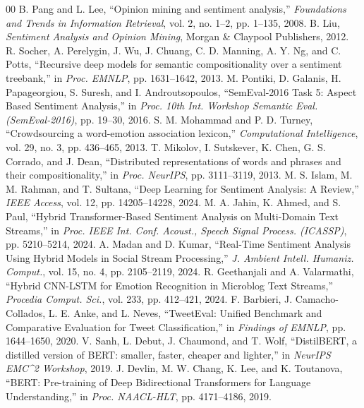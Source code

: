 \documentclass[conference]{IEEEtran}
\begin{document}

\begin{thebibliography}{00}
 B. Pang and L. Lee, ``Opinion mining and sentiment analysis,'' \textit{Foundations and Trends in Information Retrieval}, vol. 2, no. 1--2, pp. 1--135, 2008.
 B. Liu, \textit{Sentiment Analysis and Opinion Mining}, Morgan \& Claypool Publishers, 2012.
 R. Socher, A. Perelygin, J. Wu, J. Chuang, C. D. Manning, A. Y. Ng, and C. Potts, ``Recursive deep models for semantic compositionality over a sentiment treebank,'' in \textit{Proc. EMNLP}, pp. 1631--1642, 2013.
 M. Pontiki, D. Galanis, H. Papageorgiou, S. Suresh, and I. Androutsopoulos, ``SemEval-2016 Task 5: Aspect Based Sentiment Analysis,'' in \textit{Proc. 10th Int. Workshop Semantic Eval. (SemEval-2016)}, pp. 19--30, 2016.
 S. M. Mohammad and P. D. Turney, ``Crowdsourcing a word-emotion association lexicon,'' \textit{Computational Intelligence}, vol. 29, no. 3, pp. 436--465, 2013.
 T. Mikolov, I. Sutskever, K. Chen, G. S. Corrado, and J. Dean, ``Distributed representations of words and phrases and their compositionality,'' in \textit{Proc. NeurIPS}, pp. 3111--3119, 2013.
 M. S. Islam, M. M. Rahman, and T. Sultana, ``Deep Learning for Sentiment Analysis: A Review,'' \textit{IEEE Access}, vol. 12, pp. 14205--14228, 2024.
 M. A. Jahin, K. Ahmed, and S. Paul, ``Hybrid Transformer-Based Sentiment Analysis on Multi-Domain Text Streams,'' in \textit{Proc. IEEE Int. Conf. Acoust., Speech Signal Process. (ICASSP)}, pp. 5210--5214, 2024.
 A. Madan and D. Kumar, ``Real-Time Sentiment Analysis Using Hybrid Models in Social Stream Processing,'' \textit{J. Ambient Intell. Humaniz. Comput.}, vol. 15, no. 4, pp. 2105--2119, 2024.
 R. Geethanjali and A. Valarmathi, ``Hybrid CNN-LSTM for Emotion Recognition in Microblog Text Streams,'' \textit{Procedia Comput. Sci.}, vol. 233, pp. 412--421, 2024.
 F. Barbieri, J. Camacho-Collados, L. E. Anke, and L. Neves, ``TweetEval: Unified Benchmark and Comparative Evaluation for Tweet Classification,'' in \textit{Findings of EMNLP}, pp. 1644--1650, 2020.
 V. Sanh, L. Debut, J. Chaumond, and T. Wolf, ``DistilBERT, a distilled version of BERT: smaller, faster, cheaper and lighter,'' in \textit{NeurIPS EMC^2 Workshop}, 2019.
 J. Devlin, M. W. Chang, K. Lee, and K. Toutanova, ``BERT: Pre-training of Deep Bidirectional Transformers for Language Understanding,'' in \textit{Proc. NAACL-HLT}, pp. 4171--4186, 2019.

\end{thebibliography}
\end{document}
